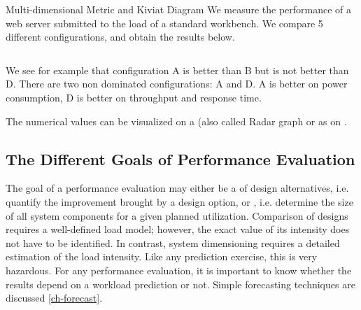 \begin{ex}{Multi-dimensional Metric and Kiviat Diagram}
We measure the performance of a web server
submitted to the load of a standard workbench. We
compare 5 different configurations, and obtain
the results below.
  \begin{center}
  \begin{tabular}{|c|c|c|c|}
    \hline
    
  \end{tabular}
  \end{center}
We see for example that configuration A is better
than B but is not better than D. There are two
non dominated configurations: A and D. A is
better on power consumption, D is better on
throughput and response time.

The numerical values can be visualized on a
 (also called Radar graph or
 as on
.\label{ex-kiviat}
\end{ex}
\begin{figure}
  \label{fig-multidim}
\end{figure}

\subsection{The Different Goals of Performance Evaluation}

The goal of a performance evaluation may either be a 
of design alternatives, i.e. quantify the improvement brought by a
design option, or , i.e. determine the size
of all system components for a given planned utilization. Comparison
of designs requires a well-defined load model; however, the exact
value of its intensity does not have to be identified. In contrast,
system dimensioning requires a detailed estimation of the load
intensity. Like any prediction exercise, this is very hazardous. For
any performance evaluation, it is important to know whether the
results depend on a workload prediction or not. Simple forecasting
techniques are discussed \cref{ch-forecast}.

